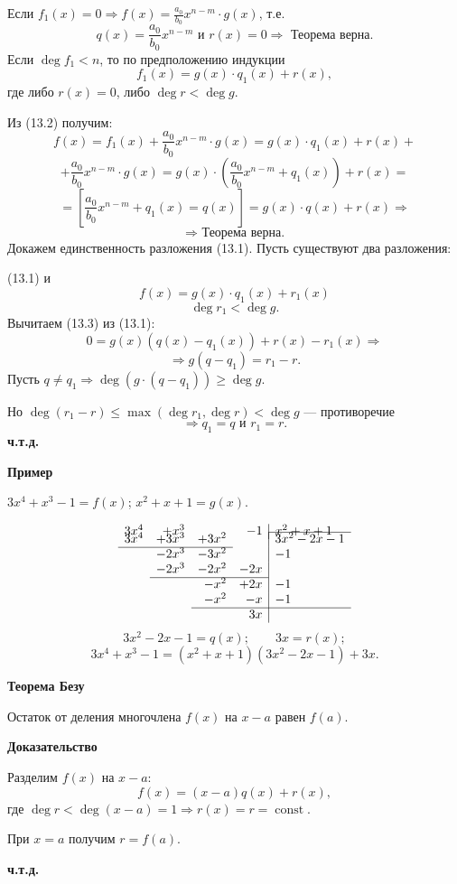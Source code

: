 \documentclass[12pt,a4paper]{article}
\begin{document}
Если $f_1(x)=0\Rightarrow f(x)=\frac{a_0}{b_0}x^{n-m}\cdot g(x)$, т.е.
$$
q(x)=\frac{a_0}{b_0}x^{n-m} \text{ и } r(x)=0\Rightarrow \text{ Теорема верна.}
$$
Если $\deg f_1<n$, то по предположению индукции
$$
f_1(x)=g(x)\cdot q_1(x)+r(x),
$$
где либо $r(x)=0$, либо $\deg r<\deg g$.

Из (13.2) получим:
$$
f(x)=f_1(x)+\frac{a_0}{b_0}x^{n-m}\cdot g(x)=g(x)\cdot q_1(x)+r(x)+
$$
$$
+\frac{a_0}{b_0}x^{n-m}\cdot
g(x)=g(x)\cdot\left(\frac{a_0}{b_0}x^{n-m}+q_1(x)\right)+r(x)=
$$
$$
=\left[\frac{a_0}{b_0}x^{n-m}+q_1(x)=q(x)\right]=g(x)\cdot q(x)+r(x)\Rightarrow
$$
$$
\Rightarrow \text{ Теорема верна.}
$$
Докажем единственность разложения (13.1). Пусть существуют два разложения:

(13.1) и
\begin{equation}
f(x)=g(x)\cdot q_1(x)+r_1(x) \tag{13.3}
\end{equation}
$$
\deg r_1<\deg g.
$$
Вычитаем (13.3) из (13.1):
$$
0=g(x)(q(x)-q_1(x))+r(x)-r_1(x)\Rightarrow
$$
$$
\Rightarrow g(q-q_1)=r_1-r.
$$
Пусть $q\ne q_1\Rightarrow \deg(g\cdot(q-q_1))\ge\deg g$.

Но $\deg(r_1-r)\le\max(\deg r_1,\deg r)<\deg g$ --- противоречие
$$
\Rightarrow q_1=q \text{ и } r_1=r.
$$
\textbf{ч.т.д.}

\textbf{Пример}

$3x^4+x^3-1=f(x)$; $x^2+x+1=g(x)$.

$$
\begin{array}{rrrr|l}
3x^4&+x^3&&-1&x^2+x+1\\[-2mm]
\cline{5-5}
3x^4&+3x^3&+3x^2&&3x^2-2x-1\\
\cline{1-3}
&-2x^3&-3x^2&&-1\\
&-2x^3&-2x^2&-2x&\\
\cline{2-4}
&&-x^2&+2x&-1\\
&&-x^2&-x&-1\\
\cline{3-5}
&&&3x&
\end{array}
$$
$$
3x^2-2x-1=q(x);\qquad 3x=r(x);
$$
$$
3x^4+x^3-1=(x^2+x+1)(3x^2-2x-1)+3x.
$$

\textbf{Теорема Безу}

Остаток от деления многочлена $f(x)$ на $x-a$ равен $f(a)$.

\textbf{Доказательство}

Разделим $f(x)$ на $x-a$:
$$
f(x)=(x-a)q(x)+r(x),
$$
где $\deg r<\deg(x-a)=1\Rightarrow r(x)=r=\operatorname{const}$.

При $x=a$ получим $r=f(a)$.

\textbf{ч.т.д.}
\end{document}
